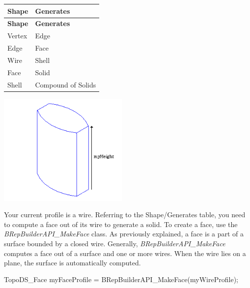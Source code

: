 \tabulinesep=1mm
\begin{longtabu} spread 0pt [c]{*{2}{|X[-1]}|}
\hline
\rowcolor{\tableheadbgcolor}\textbf{ Shape }&\textbf{ Generates  }\\
\endfirsthead
\hline
\endfoot
\hline
\rowcolor{\tableheadbgcolor}\textbf{ Shape }&\textbf{ Generates  }\\
\endhead
Vertex &Edge \\
Edge &Face \\
Wire &Shell \\
Face &Solid \\
Shell &Compound of Solids \\
\end{longtabu}

\begin{DoxyImageNoCaption}
\begin{center}
   \mbox{\includegraphics[width=240]{tutorial_image007.png}}
\end{center}
\end{DoxyImageNoCaption}


Your current profile is a wire. Referring to the Shape/\+Generates table, you need to compute a face out of its wire to generate a solid. To create a face, use the {\itshape B\+Rep\+Builder\+A\+P\+I\+\_\+\+Make\+Face} class. As previously explained, a face is a part of a surface bounded by a closed wire. Generally, {\itshape B\+Rep\+Builder\+A\+P\+I\+\_\+\+Make\+Face} computes a face out of a surface and one or more wires. When the wire lies on a plane, the surface is automatically computed.


\begin{DoxyCode}
TopoDS\_Face myFaceProfile = BRepBuilderAPI\_MakeFace(myWireProfile);
\end{DoxyCode}


